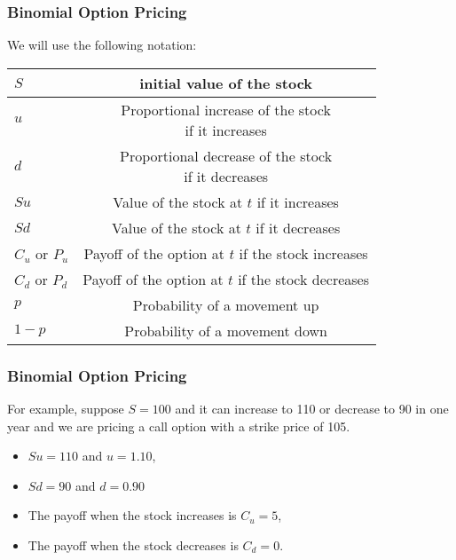 \documentclass{beamer}
\theoremstyle{plain}
\theoremstyle{definition}
\theoremstyle{remark}
\begin{document}
\begin{frame}
\frametitle{Binomial Option Pricing}


We will use the following notation:
\begin{table}
\centering
\begin{tabular}{lc}
\hline
$S$ & initial value of the stock \\ \hline
$u$  & \shortstack{Proportional increase of the stock \\ if it increases} \\ \hline
$d$ & \shortstack{Proportional decrease of the stock \\ if it decreases} \\ \hline
$Su$ & \shortstack{Value  of the stock at $t$ \\ if it increases} \\ \hline
$Sd$ & \shortstack{Value  of the stock at $t$ \\ if it decreases} \\ \hline
$C_u$ or $P_u$ & \shortstack{Payoff  of the option at $t$ \\ if the stock increases} \\ \hline
$C_d$ or $P_d$ & \shortstack{Payoff  of the option at $t$ \\ if the stock decreases} \\ \hline
$p$ & Probability of a movement up \\ \hline
$1-p$ & Probability of a movement down \\ \hline
\end{tabular}
\end{table}


\end{frame}

\begin{frame}
\frametitle{Binomial Option Pricing}
For example, suppose $S = 100$ and it can increase to 110 or decrease to 90 in one year and we are pricing a call option with a strike price of 105. 
\begin{itemize}
\item $Su = 110$ and $u = 1.10$,
\item $Sd = 90$ and $d = 0.90$
\item The payoff when the stock increases is $C_u = 5$,
\item The payoff when the stock decreases is $C_d = 0$. 
\end{itemize}


\end{frame}
\end{document}
